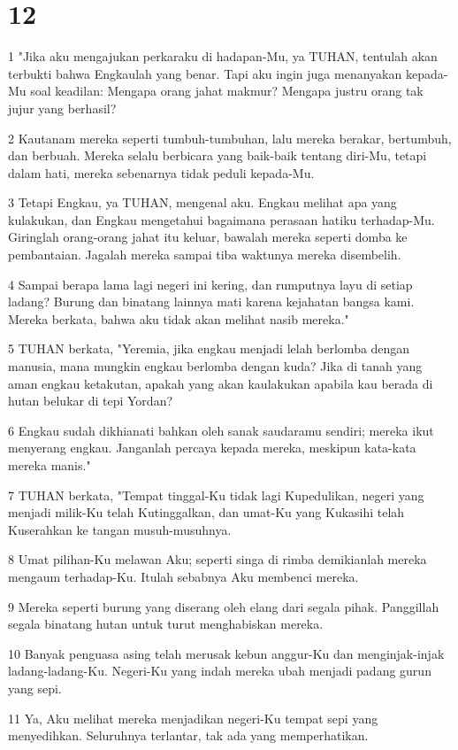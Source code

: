 \chapter{12}

\par 1 "Jika aku mengajukan perkaraku di hadapan-Mu, ya TUHAN, tentulah akan terbukti bahwa Engkaulah yang benar. Tapi aku ingin juga menanyakan kepada-Mu soal keadilan: Mengapa orang jahat makmur? Mengapa justru orang tak jujur yang berhasil?
\par 2 Kautanam mereka seperti tumbuh-tumbuhan, lalu mereka berakar, bertumbuh, dan berbuah. Mereka selalu berbicara yang baik-baik tentang diri-Mu, tetapi dalam hati, mereka sebenarnya tidak peduli kepada-Mu.
\par 3 Tetapi Engkau, ya TUHAN, mengenal aku. Engkau melihat apa yang kulakukan, dan Engkau mengetahui bagaimana perasaan hatiku terhadap-Mu. Giringlah orang-orang jahat itu keluar, bawalah mereka seperti domba ke pembantaian. Jagalah mereka sampai tiba waktunya mereka disembelih.
\par 4 Sampai berapa lama lagi negeri ini kering, dan rumputnya layu di setiap ladang? Burung dan binatang lainnya mati karena kejahatan bangsa kami. Mereka berkata, bahwa aku tidak akan melihat nasib mereka."
\par 5 TUHAN berkata, "Yeremia, jika engkau menjadi lelah berlomba dengan manusia, mana mungkin engkau berlomba dengan kuda? Jika di tanah yang aman engkau ketakutan, apakah yang akan kaulakukan apabila kau berada di hutan belukar di tepi Yordan?
\par 6 Engkau sudah dikhianati bahkan oleh sanak saudaramu sendiri; mereka ikut menyerang engkau. Janganlah percaya kepada mereka, meskipun kata-kata mereka manis."
\par 7 TUHAN berkata, "Tempat tinggal-Ku tidak lagi Kupedulikan, negeri yang menjadi milik-Ku telah Kutinggalkan, dan umat-Ku yang Kukasihi telah Kuserahkan ke tangan musuh-musuhnya.
\par 8 Umat pilihan-Ku melawan Aku; seperti singa di rimba demikianlah mereka mengaum terhadap-Ku. Itulah sebabnya Aku membenci mereka.
\par 9 Mereka seperti burung yang diserang oleh elang dari segala pihak. Panggillah segala binatang hutan untuk turut menghabiskan mereka.
\par 10 Banyak penguasa asing telah merusak kebun anggur-Ku dan menginjak-injak ladang-ladang-Ku. Negeri-Ku yang indah mereka ubah menjadi padang gurun yang sepi.
\par 11 Ya, Aku melihat mereka menjadikan negeri-Ku tempat sepi yang menyedihkan. Seluruhnya terlantar, tak ada yang memperhatikan.
